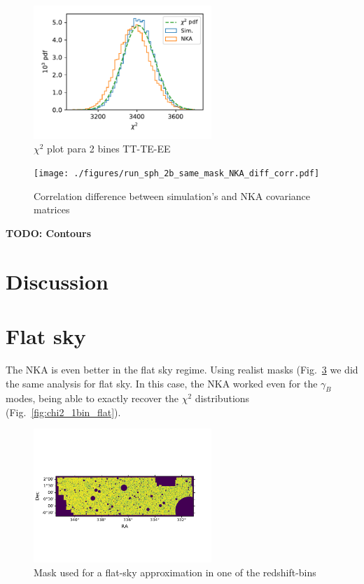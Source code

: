 \documentclass[a4paper,11pt]{article}
\newcommand{\todo}[1]{{\bf TODO: #1}}
\begin{document}
\begin{figure}[htb]
  \centering
  \includegraphics[width=0.6\textwidth]{./figures/run_sph_2b_same_mask_NKA_TTTEEE_Full_chi2.pdf}
  \caption{$\chi^2$ plot para 2 bines TT-TE-EE}
  \label{fig:chi2_2bins}
\end{figure}

\begin{figure}[htb]
  \centering
  \texttt{[image: ./figures/run\_sph\_2b\_same\_mask\_NKA\_diff\_corr.pdf]}
  \caption{Correlation difference between simulation's and NKA covariance
    matrices}
  \label{fig:corr_diff_2bins}
\end{figure}

\todo{Contours}

\section{Discussion}\label{sec:discussion}

\appendix
\section{Flat sky}
The NKA is even better in the flat sky regime. Using realist masks
(Fig.~\ref{fig:mask_flat} we did the same analysis for flat sky. In this case,
the NKA worked even for the $\gamma_B$ modes, being able to exactly recover
the $\chi^2$ distributions (Fig.~\ref{fig:chi2_1bin_flat}).

\begin{figure}[htb]
  \centering
  \includegraphics[width=0.6\textwidth]{./figures/mask-lss_flat1.pdf}
  \caption{Mask used for a flat-sky approximation in one of the redshift-bins}
  \label{fig:mask_flat}
\end{figure}
\end{document}
